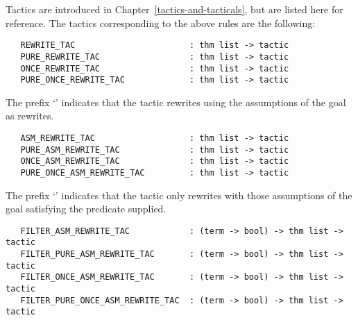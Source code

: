 \noindent Tactics are introduced in Chapter~\ref{tactics-and-tacticals},
but are listed here for reference.
The tactics corresponding to the above rules are the following:

\begin{hol}\begin{verbatim}
   REWRITE_TAC                       : thm list -> tactic
   PURE_REWRITE_TAC                  : thm list -> tactic
   ONCE_REWRITE_TAC                  : thm list -> tactic
   PURE_ONCE_REWRITE_TAC             : thm list -> tactic
\end{verbatim}\end{hol}

\noindent The prefix `' 
indicates that the tactic rewrites using the assumptions
of the goal as rewrites.

\begin{hol}
\begin{verbatim}
   ASM_REWRITE_TAC                   : thm list -> tactic
   PURE_ASM_REWRITE_TAC              : thm list -> tactic
   ONCE_ASM_REWRITE_TAC              : thm list -> tactic
   PURE_ONCE_ASM_REWRITE_TAC         : thm list -> tactic
\end{verbatim}\end{hol}

\noindent The prefix `'
indicates that the tactic only rewrites with
those assumptions of the goal satisfying the predicate supplied.

\begin{hol}\begin{verbatim}
   FILTER_ASM_REWRITE_TAC            : (term -> bool) -> thm list -> tactic
   FILTER_PURE_ASM_REWRITE_TAC       : (term -> bool) -> thm list -> tactic
   FILTER_ONCE_ASM_REWRITE_TAC       : (term -> bool) -> thm list -> tactic
   FILTER_PURE_ONCE_ASM_REWRITE_TAC  : (term -> bool) -> thm list -> tactic
\end{verbatim}\end{hol}
